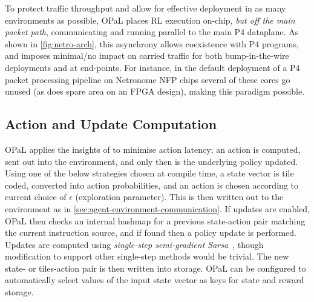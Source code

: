 \documentclass[
sigconf,natbib=false
]{acmart}
\newcommand{\approachshort}{OPaL}
\begin{document}

To protect traffic throughput and allow for effective deployment in as many environments as possible, \approachshort{} places RL execution on-chip, \emph{but off the main packet path}, communicating and running parallel to the main P4 dataplane.
As shown in \cref{fig:netro-arch}, this asynchrony allows coexistence with P4 programs, and imposes minimal/no impact on carried traffic for both bump-in-the-wire deployments and at end-points.
For instance, in the default deployment of a P4 packet processing pipeline on Netronome NFP chips several of these cores go unused (as does spare area on an FPGA design), making this paradigm possible.

%

\subsection{Action and Update Computation}\label{sec:action-and-update-computation}
\approachshort{} applies the insights of \textcite{DBLP:journals/firai/TravnikMSP18} to minimise action latency; an action is computed, sent out into the environment, and only then is the underlying policy updated.
Using one of the below strategies chosen at compile time, a state vector is tile coded, converted into action probabilities, and an action is chosen according to current choice of $\epsilon$ (exploration parameter).
This is then written out to the environment as in \cref{sec:agent-environment-communication}.
If updates are enabled, \approachshort{} then checks an internal hashmap for a previous state-action pair matching the current instruction source, and if found then a policy update is performed.
Updates are computed using \emph{single-step semi-gradient Sarsa}~\cite[pp. \numrange{217}{221}]{RL2E}, though modification to support other single-step methods would be trivial.
The new state- or tiles-action pair is then written into storage.
\approachshort{} can be configured to automatically select values of the input state vector as keys for state and reward storage.
\end{document}
